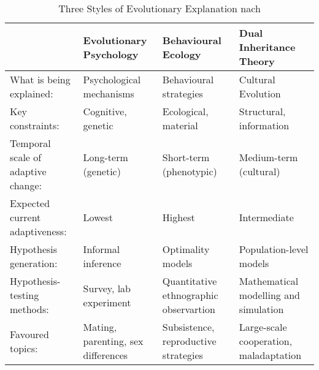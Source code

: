 \documentclass[openany,twoside,twocolumn]{book}
\begin{document}
\begin{table*}[t]

\caption{\label{tab:smiththreestyles}Three Styles of Evolutionary Explanation nach \textcite{SmithThreestylesevolutionary2000}}
\centering
\fontsize{8}{10}\selectfont
\begin{tabu} to 
\toprule
 & Evolutionary Psychology & Behavioural Ecology & Dual Inheritance Theory\\
\midrule
What is being explained: & Psychological mechanisms & Behavioural strategies & Cultural Evolution\\
\addlinespace
Key constraints: & Cognitive, genetic & Ecological, material & Structural, information\\
\addlinespace
Temporal scale of adaptive change: & Long-term (genetic) & Short-term (phenotypic) & Medium-term (cultural)\\
\addlinespace
Expected current adaptiveness: & Lowest & Highest & Intermediate\\
\addlinespace
Hypothesis generation: & Informal inference & Optimality models & Population-level models\\
\addlinespace
Hypothesis-testing methods: & Survey, lab experiment & Quantitative ethnographic observartion & Mathematical modelling and simulation\\
\addlinespace
Favoured topics: & Mating, parenting, sex differences & Subsistence, reproductive strategies & Large-scale cooperation, maladaptation\\
\bottomrule
\end{tabu}
\end{table*}
\end{document}
